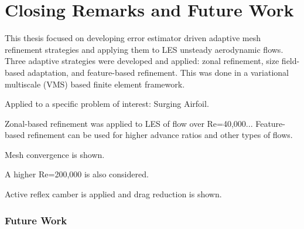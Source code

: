 \chapter{Closing Remarks and Future Work}

This thesis focused on developing error estimator driven adaptive mesh refinement strategies and applying them to LES unsteady aerodynamic flows.
Three adaptive strategies were developed and applied: zonal refinement, size field-based adaptation, and
feature-based refinement. This was done in a variational multiscale (VMS) based finite element framework.

Applied to a specific problem of interest: Surging Airfoil.

Zonal-based refinement was applied to LES of flow over Re=40,000...
Feature-based refinement can be used for higher advance ratios and other types of flows.

Mesh convergence is shown.

A higher Re=200,000 is also considered.

Active reflex camber is applied and drag reduction is shown.

\subsection{Future Work}